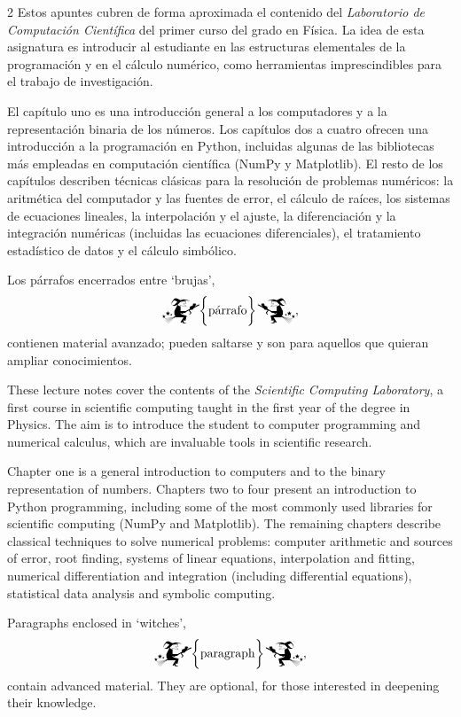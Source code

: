 \begin{paracol}{2}
Estos apuntes cubren de forma aproximada el contenido del \emph{Laboratorio de Computación Científica} del primer curso del grado en Física. La idea de esta asignatura es introducir al estudiante en las estructuras elementales de la programación y en el cálculo numérico, como herramientas imprescindibles para el trabajo de investigación.

El capítulo uno es una introducción general a los computadores y a la representación binaria de los números. Los capítulos dos a cuatro ofrecen una introducción a la programación en Python, incluidas algunas de las bibliotecas más empleadas en computación científica (NumPy y Matplotlib). El resto de los capítulos describen técnicas clásicas para la resolución de problemas numéricos: la aritmética del computador y las fuentes de error, el cálculo de raíces, los sistemas de ecuaciones lineales, la interpolación y el ajuste, la diferenciación y la integración numéricas (incluidas las ecuaciones diferenciales), el tratamiento estadístico de datos y el cálculo simbólico.

Los párrafos encerrados entre `brujas',
\begin{equation*}
	\mathwitch* \biggl \{ \text{párrafo} \biggr \} \reversemathwitch*,
\end{equation*}
contienen material avanzado; pueden saltarse y son para aquellos que quieran ampliar conocimientos.

\switchcolumn
These lecture notes cover the contents of the \emph{Scientific Computing Laboratory}, a first course in scientific computing taught in the first year of the degree in Physics. The aim is to introduce the student to computer programming and numerical calculus, which are invaluable tools in scientific research.

Chapter one is a general introduction to computers and to the binary representation of numbers. Chapters two to four present an introduction to Python programming, including some of the most commonly used libraries for scientific computing (NumPy and Matplotlib). The remaining chapters describe classical techniques to solve numerical problems: computer arithmetic and sources of error, root finding, systems of linear equations, interpolation and fitting, numerical differentiation and integration (including differential equations), statistical data analysis and symbolic computing.

Paragraphs enclosed in `witches',
\begin{equation*}
\mathwitch* \biggl \{ \text{paragraph} \biggr \}\reversemathwitch*,
\end{equation*}
contain advanced material. They are optional, for those interested in deepening their knowledge.


\end{paracol}
